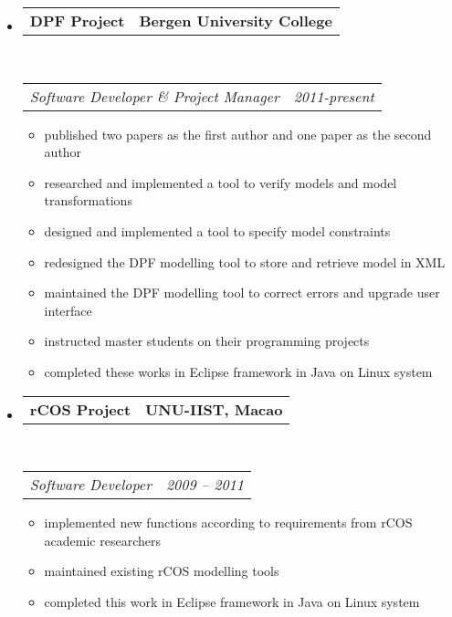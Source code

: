 \documentclass[12pt,letterpaper]{article}
\makeatletter
\newcommand{\headrows}[2]
{\begin{tabular*}{\linewidth}{l@{\extracolsep{\fill}}r}
	#1 &
	#2 \\
\end{tabular*}}
\makeatother
\begin{document}
\begin{itemize}[leftmargin=*]
	\parskip=0.2em
	\item
	\headrows
		{\textbf{DPF Project }}
		{\textbf{Bergen University College}}
	\\
	\headrows
		{\emph{Software Developer \& Project Manager}}
		{\emph{2011-present}}
	\begin{itemize}[label={{\Forward}}, leftmargin=1.3em]
        \setlength{\itemsep}{0.1\baselineskip}
        \item published two papers as the first author and one paper as the second author
        \item researched and implemented a tool to  verify models and model transformations 
        \item designed and implemented a tool to specify model constraints
        \item redesigned the DPF modelling tool to store and retrieve model in XML
        \item maintained the DPF modelling tool to correct errors and upgrade user interface 
        \item instructed master students on their programming projects
        \item completed these works in Eclipse framework in Java on Linux system
    \end{itemize}

	\item
	\headrows
		{\textbf{rCOS Project}}
		{\textbf{UNU-IIST, Macao}}
	\\
	\headrows
		{\emph{Software Developer}}
		{\emph{2009 -- 2011}}
	\begin{itemize}[label={{\Forward}}, leftmargin=1.3em]
        \setlength{\itemsep}{0.1\baselineskip}
        \item implemented new  functions according to requirements from rCOS academic researchers
        \item maintained existing rCOS modelling tools
        \item completed this work in Eclipse framework in Java on Linux system
    \end{itemize}


\end{itemize}
\end{document}
